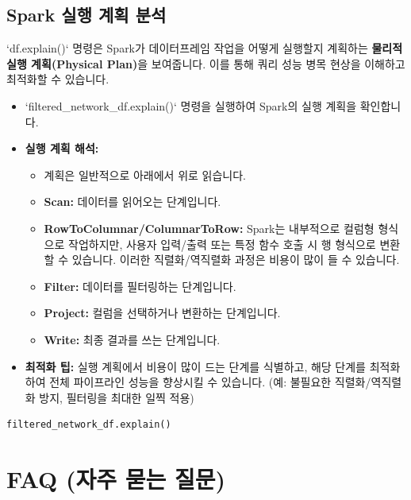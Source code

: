 \documentclass[11pt,a4paper]{article}
\begin{document}
\subsection{Spark 실행 계획 분석}

\begin{conceptbox}
`df.explain()` 명령은 Spark가 데이터프레임 작업을 어떻게 실행할지 계획하는 \textbf{물리적 실행 계획(Physical Plan)}을 보여줍니다. 이를 통해 쿼리 성능 병목 현상을 이해하고 최적화할 수 있습니다.
\end{conceptbox}

\begin{itemize}
    \item `filtered_network_df.explain()` 명령을 실행하여 Spark의 실행 계획을 확인합니다.
    \item \textbf{실행 계획 해석:}
    \begin{itemize}
        \item 계획은 일반적으로 아래에서 위로 읽습니다.
        \item \textbf{Scan:} 데이터를 읽어오는 단계입니다.
        \item \textbf{RowToColumnar/ColumnarToRow:} Spark는 내부적으로 컬럼형 형식으로 작업하지만, 사용자 입력/출력 또는 특정 함수 호출 시 행 형식으로 변환할 수 있습니다. 이러한 직렬화/역직렬화 과정은 비용이 많이 들 수 있습니다.
        \item \textbf{Filter:} 데이터를 필터링하는 단계입니다.
        \item \textbf{Project:} 컬럼을 선택하거나 변환하는 단계입니다.
        \item \textbf{Write:} 최종 결과를 쓰는 단계입니다.
    \end{itemize}
    \item \textbf{최적화 팁:} 실행 계획에서 비용이 많이 드는 단계를 식별하고, 해당 단계를 최적화하여 전체 파이프라인 성능을 향상시킬 수 있습니다. (예: 불필요한 직렬화/역직렬화 방지, 필터링을 최대한 일찍 적용)
\end{itemize}

\begin{lstlisting}
filtered_network_df.explain()
\end{lstlisting}

\newpage
\section{FAQ (자주 묻는 질문)}
\end{document}
